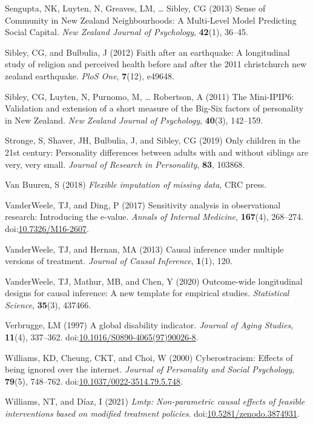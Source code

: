 \documentclass[
  single column]{article}
\newlength{\cslhangindent}
\newenvironment{CSLReferences}[2] %
 {\begin{list}{}{%
  \setlength{\itemindent}{0pt}
  \setlength{\leftmargin}{0pt}
  \setlength{\parsep}{0pt}
  \ifodd #1
   \setlength{\leftmargin}{\cslhangindent}
   \setlength{\itemindent}{-1\cslhangindent}
  \fi
  \setlength{\itemsep}{#2\baselineskip}}}
 {\end{list}}
\begin{document}
\begin{CSLReferences}{1}{0}
Sengupta, NK, Luyten, N, Greaves, LM, \ldots{} Sibley, CG (2013) Sense
of Community in New Zealand Neighbourhoods: A Multi-Level Model
Predicting Social Capital. \emph{New Zealand Journal of Psychology},
\textbf{42}(1), 36--45.

Sibley, CG, and Bulbulia, J (2012) Faith after an earthquake: A
longitudinal study of religion and perceived health before and after the
2011 christchurch new zealand earthquake. \emph{PloS One},
\textbf{7}(12), e49648.

Sibley, CG, Luyten, N, Purnomo, M, \ldots{} Robertson, A (2011) The
Mini-IPIP6: Validation and extension of a short measure of the Big-Six
factors of personality in New Zealand. \emph{New Zealand Journal of
Psychology}, \textbf{40}(3), 142--159.

Stronge, S, Shaver, JH, Bulbulia, J, and Sibley, CG (2019) Only children
in the 21st century: Personality differences between adults with and
without siblings are very, very small. \emph{Journal of Research in
Personality}, \textbf{83}, 103868.

Van Buuren, S (2018) \emph{Flexible imputation of missing data}, CRC
press.

VanderWeele, TJ, and Ding, P (2017) Sensitivity analysis in
observational research: Introducing the e-value. \emph{Annals of
Internal Medicine}, \textbf{167}(4), 268--274.
doi:\href{https://doi.org/10.7326/M16-2607}{10.7326/M16-2607}.

VanderWeele, TJ, and Hernan, MA (2013) Causal inference under multiple
versions of treatment. \emph{Journal of Causal Inference},
\textbf{1}(1), 120.

VanderWeele, TJ, Mathur, MB, and Chen, Y (2020) Outcome-wide
longitudinal designs for causal inference: A new template for empirical
studies. \emph{Statistical Science}, \textbf{35}(3), 437466.

Verbrugge, LM (1997) A global disability indicator. \emph{Journal of
Aging Studies}, \textbf{11}(4), 337--362.
doi:\href{https://doi.org/10.1016/S0890-4065(97)90026-8}{10.1016/S0890-4065(97)90026-8}.

Williams, KD, Cheung, CKT, and Choi, W (2000) Cyberostracism: Effects of
being ignored over the internet. \emph{Journal of Personality and Social
Psychology}, \textbf{79}(5), 748--762.
doi:\href{https://doi.org/10.1037/0022-3514.79.5.748}{10.1037/0022-3514.79.5.748}.

Williams, NT, and Díaz, I (2021) \emph{Lmtp: Non-parametric causal
effects of feasible interventions based on modified treatment policies}.
doi:\href{https://doi.org/10.5281/zenodo.3874931}{10.5281/zenodo.3874931}.

\end{CSLReferences}
\end{document}
